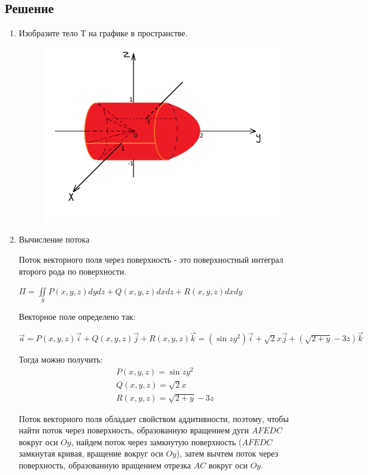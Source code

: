 \subsection{Решение}
\begin{enumerate}
    \item Изобразите тело Т на графике в пространстве.

    \begin{figure}[!htbp]
      \centering
    \includegraphics[scale = 0.5]{images/Math_RW4_task3.png}
    \end{figure}

    \item Вычисление потока

    Поток векторного поля через поверхность - это поверхностный интеграл второго рода по поверхности.

    $\Pi = \iint\limits_{S} P(x,y,z)dydz + Q(x,y,z)dxdz + R(x,y,z)dxdy$

    Векторное поле определено так:

    $\Vec{a} = P(x,y,z)\Vec{i} + Q(x,y,z)\Vec{j} + R(x,y,z)\Vec{k} = (\sin{zy^2})\Vec{i} + \sqrt{2}x\Vec{j} + (\sqrt{2+y}-3z)\Vec{k}$

    Тогда можно получить:
    \begin{align*}
        &P(x,y,z) = \sin{zy^2}\\
        &Q(x,y,z) = \sqrt{2}x\\
        &R(x,y,z) = \sqrt{2+y}-3z
    \end{align*}

    Поток векторного поля обладает свойством аддитивности, поэтому, чтобы найти поток через поверхность, образованную вращением дуги $AFEDC$ вокруг оси $Oy$, найдем поток через замкнутую поверхность ($AFEDC$ замкнутая кривая, вращение вокруг оси $Oy$), затем вычтем поток через поверхность, образованную вращением отрезка $AC$ вокруг оси $Oy$.


\end{enumerate}
